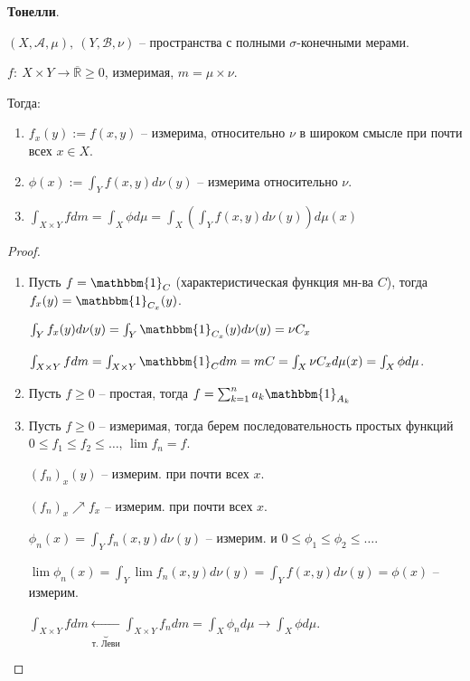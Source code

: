\begin{theorem}
    \textbf{Тонелли}.

    $(X, \mathcal{A}, \mu), \ (Y, \mathcal{B}, \nu)$ -- пространства с полными $\sigma$-конечными мерами.

    $f: \ X \times Y \rightarrow \overline{\mathbb{R}} \geq 0$, измеримая, $m = \mu \times \nu$.

    Тогда: 
    \begin{enumerate}
        \item {
            $f_x(y) := f(x, y)$ -- измерима, относительно $\nu$ в широком смысле при почти всех $x \in X$.
        }
        \item {
            $\phi(x) := \int_Y { f(x, y) d \nu(y) }$ -- измерима относительно $\nu$.
        }
        \item {
            $\int_{X \times Y} {f d m} = \int_{X} {\phi d \mu} = \int_{X} {\left(\int_{Y} {f(x, y) d \nu(y)}\right) d \mu(x)}$
        }
    \end{enumerate}
\end{theorem}
\begin{proof}
    \begin{enumerate}
        \item {
            Пусть $f = \mathbbm{1}_C$ (характеристическая функция мн-ва $C$), тогда $f_x(y) = \mathbbm{1}_{C_x}(y)$.

            $\int_Y {f_x(y)d \nu(y)} = \int_Y {\mathbbm{1}_{C_x}(y) d \nu(y)} = \nu C_{x}$

            $\int_{X \times Y} {f d m} = \int_{X \times Y} {\mathbbm{1}_C d m} = m C = \int_X {\nu C_x d \mu(x)} = \int_X {\phi d \mu}$.
        }
        \item {
            Пусть $f \geq 0$ -- простая, тогда $f = \sum_{k=1}^{n} a_k \mathbbm{1}_{A_k}$
        }
        \item {
            Пусть $f \geq 0$ -- измеримая, тогда берем последовательность простых функций $0 \leq f_1 \leq f_2 \leq \dots$, $\lim{f_n} = f$.

            $(f_n)_x(y)$ -- измерим. при почти всех $x$.

            $(f_n)_x \nearrow f_x$ -- измерим. при почти всех $x$.

            $\phi_n(x) = \int_Y {f_n(x, y) d \nu (y)}$ -- измерим. и $0 \leq \phi_1 \leq \phi_2 \leq \dots$.

            $\lim{\phi_n(x)} = \int_Y{\lim{f_n (x, y)} d \nu(y)} = \int_Y{f(x, y) d \nu(y)} = \phi(x)$ -- измерим.

            $\int_{X \times Y}{f d m} \underbrace{\leftarrow}_{\text{т. Леви}} \int_{X \times Y} {f_n d m} = \int_X {\phi_n d \mu} \rightarrow \int_X{\phi d \mu}$.
        }
    \end{enumerate}
\end{proof}


